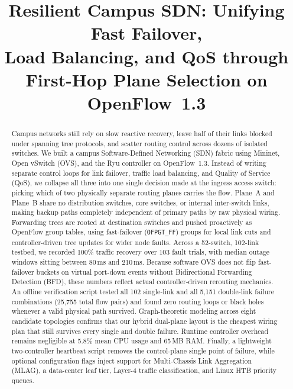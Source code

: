 \documentclass[conference]{IEEEtran}
\begin{document}
\title{Resilient Campus SDN: Unifying Fast Failover,\\ Load Balancing, and QoS through\\ First-Hop Plane Selection on OpenFlow~1.3}

\author{
}

\maketitle

\begin{abstract}
Campus networks still rely on slow reactive recovery, leave half of their links blocked under spanning tree protocols, and scatter routing control across dozens of isolated switches. We built a campus Software-Defined Networking (SDN) fabric using Mininet, Open vSwitch (OVS), and the Ryu controller on OpenFlow~1.3. Instead of writing separate control loops for link failover, traffic load balancing, and Quality of Service (QoS), we collapse all three into one single decision made at the ingress access switch: picking which of two physically separate routing planes carries the flow. Plane~A and Plane~B share no distribution switches, core switches, or internal inter-switch links, making backup paths completely independent of primary paths by raw physical wiring. Forwarding trees are rooted at destination switches and pushed proactively as OpenFlow group tables, using fast-failover (\texttt{OFPGT\_FF}) groups for local link cuts and controller-driven tree updates for wider node faults. Across a 52-switch, 102-link testbed, we recorded 100\% traffic recovery over 103 fault trials, with median outage windows sitting between 80\,ms and 210\,ms. Because software OVS does not flip fast-failover buckets on virtual port-down events without Bidirectional Forwarding Detection (BFD), these numbers reflect actual controller-driven rerouting mechanics. An offline verification script tested all 102 single-link and all 5{,}151 double-link failure combinations (25{,}755 total flow pairs) and found zero routing loops or black holes whenever a valid physical path survived. Graph-theoretic modeling across eight candidate topologies confirms that our hybrid dual-plane layout is the cheapest wiring plan that still survives every single and double failure. Runtime controller overhead remains negligible at 5.8\% mean CPU usage and 65\,MB RAM. Finally, a lightweight two-controller heartbeat script removes the control-plane single point of failure, while optional configuration flags inject support for Multi-Chassis Link Aggregation (MLAG), a data-center leaf tier, Layer-4 traffic classification, and Linux HTB priority queues.
\end{abstract}
\end{document}
